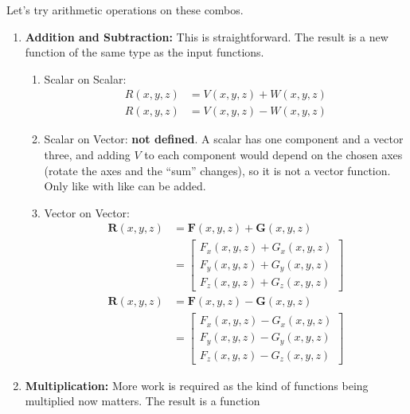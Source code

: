 Let's try arithmetic operations on these combos.
\begin{enumerate}
  \item \textbf{Addition and Subtraction:} This is straightforward. The
    result is a new function of the same type as the input functions.
    \begin{enumerate}
      \item Scalar on Scalar:
        \begin{align*}
          R(x, y, z) &= V(x, y, z) + W(x, y, z) \\
          R(x, y, z) &= V(x, y, z) - W(x, y, z)
        \end{align*}
      \item Scalar on Vector: \textbf{not defined}. A scalar has one
        component and a vector three, and adding \(V\) to each component would
        depend on the chosen axes (rotate the axes and the ``sum'' changes),
        so it is not a vector function. Only like with like can be added.
      \item Vector on Vector:
        \begin{align*}
          \mathbf{R}(x, y, z) &= \mathbf{F}(x, y, z) + \mathbf{G}(x, y, z) \\
                               &= \begin{bmatrix}
                                    F_x(x, y, z) + G_x(x, y, z) \\
                                    F_y(x, y, z) + G_y(x, y, z) \\
                                    F_z(x, y, z) + G_z(x, y, z)
                                  \end{bmatrix} \\
          \mathbf{R}(x, y, z) &= \mathbf{F}(x, y, z) - \mathbf{G}(x, y, z) \\
                               &= \begin{bmatrix}
                                    F_x(x, y, z) - G_x(x, y, z) \\
                                    F_y(x, y, z) - G_y(x, y, z) \\
                                    F_z(x, y, z) - G_z(x, y, z)
                                  \end{bmatrix}
        \end{align*}
    \end{enumerate}
  \item \textbf{Multiplication:} More work is required as the kind of
    functions being multiplied now matters. The result is a function

\end{enumerate}
